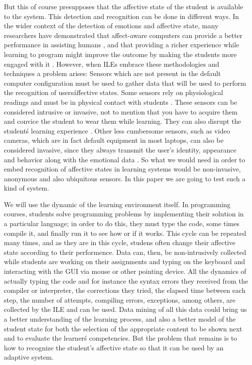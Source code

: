 \documentclass[a4paper,twoside]{article}
\begin{document}
But this of course presupposes that the affective state of the student is available to the
system. This detection and recognition can be done in different
ways. In the wider context of the detection of emotions and affective
state, many researchers have
demonstrated that affect-aware computers can provide a better performance in
assisting humans
\cite{picard2001toward,munson2018models,bosch2017affective}, and that
providing a richer experience while learning to program might improve
the outcome by making the students more engaged with it
\cite{asensio2014progamer}. However, when ILEs embrace these methodologies
and techniques a
problem arises: Sensors which are not present in the default computer
configuration must be used to gather data that will be used to perform the
recognition of users\' affective states.
Some sensors rely on physiological readings
and must be in physical contact with students \cite{atkinson2017assessing,swansianalyzing}.
These sensors can be considered
intrusive or invasive, not to mention that you have to acquire them
and convice the student to wear them while learning.  They can also disrupt the student\'s learning experience
\cite{zhai2008stress, sidney2005integrating, arroyo2009emotion}.
Other less cumbersome sensors, such as video cameras, which are in
fact default equipment in most laptops, can also be considered invasive, since
they always transmit the user's identity, appearance and behavior along with
the emotional data \cite{picard2001toward}. So what we would need in
order to embed recognition of affective states in learning systems
would be non-invasive, anonymous and also ubiquitous sensors. In this
paper we are going to test such a kind of system.

We will use the dynamic of the learning environment itself. In programming courses, students solve programming problems by implementing
their solution in a particular language; in order to do this, they
must type the code, some times compile it, and finally run it to see how or if
it works. This cycle can be repeated many times, and as they are in this cycle,
studens often change their affective state according to their performence.
Data can, then, be non-intrusively collected while students are
working on their assignments and typing on the keyboard and
interacting with the GUI via mouse or other pointing device.
All the dynamics of actually typing the code and for instance
the syntax errors they received from the compiler or interpreter, the
corrections they tried, the elapsed time between each step, the number of attempts,
compiling errors, exceptions, among others, are collected by the ILE
and can be used. Data mining of all this data could
bring us a better understanding of the learning process, and also a better
model of the student state for both the selection of the appropriate
content to be shown next and to evaluate the
learner\'s competencies. But the problem that remains is to how to recognize
the student's affective state so that it can be used by an adaptive system.
\end{document}
